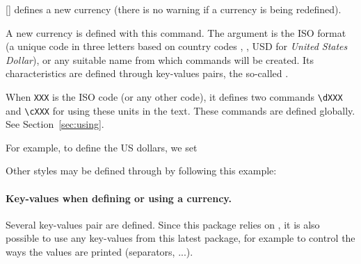 \documentclass[12pt,add-index]{cnltx-doc}
\begin{document}
\begin{commands}
    [] 
    defines a new currency (there is no warning if a currency is being redefined).
\end{commands}

A new currency is defined  with this command. The argument 
is the ISO format (a unique code in three letters based on country codes \cite{iso,iso:wikipedia}, \eg, USD
for \emph{United States Dollar}), or any suitable name from which commands will be created.
Its characteristics are defined through key-values pairs, the so-called .

When \verb|XXX| is the ISO code (or any other code), it defines 
two commands \verb|\dXXX| and \verb|\cXXX| for using these units in the text.
These commands are defined globally. 
See Section~\ref{sec:using}.


For example, to define the US dollars, we set

\begin{sourcecode}
\end{sourcecode}


Other styles may be defined through  by following this example:
\begin{example}
\end{example}

\paragraph*{Key-values when defining or using a currency.}

Several key-values pair are defined. Since this package relies on ,
it is also possible to use any key-values from this latest package, for example 
to control the ways the values are printed (separators, ...).
\end{document}
